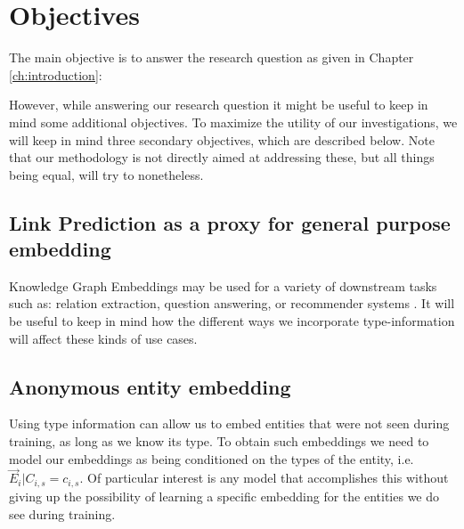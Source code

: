 \section{Objectives}\label{sec:method:objectives}%
The main objective is to answer the research question as given in Chapter \ref{ch:introduction}:
\begin{quote}
    
\end{quote}
%
However, while answering our research question it might be useful to keep in mind some additional objectives. To maximize the utility of our investigations, we will keep in mind three secondary objectives, which are described below. Note that our methodology is not directly aimed at addressing these, but all things being equal, will try to nonetheless.

\subsection{Link Prediction as a proxy for general purpose embedding}
Knowledge Graph Embeddings may be used for a variety of downstream tasks such as: relation extraction, question answering, or recommender systems . 
It will be useful to keep in mind how the different ways we incorporate type-information will affect these kinds of use cases.


\subsection{Anonymous entity embedding}
Using type information can allow us to embed entities that were not seen during training, as long as we know its type. 
%
To obtain such embeddings we need to model our embeddings as being conditioned on the types of the entity, i.e. $\vec{E}_i | C_{i,s}\!=\!c_{i,s}$.
Of particular interest is any model that accomplishes this without giving up the possibility of learning a specific embedding for the entities we do see during training.




